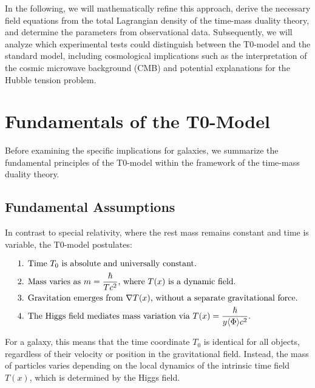 \documentclass[a4paper,12pt]{article}
\newcommand{\Tfield}{T(x)}
\begin{document}
	In the following, we will mathematically refine this approach, derive the necessary field equations from the total Lagrangian density of the time-mass duality theory, and determine the parameters from observational data. Subsequently, we will analyze which experimental tests could distinguish between the T0-model and the standard model, including cosmological implications such as the interpretation of the cosmic microwave background (CMB) and potential explanations for the Hubble tension problem.
	
	\section{Fundamentals of the T0-Model}
	
	Before examining the specific implications for galaxies, we summarize the fundamental principles of the T0-model within the framework of the time-mass duality theory.
	
	\subsection{Fundamental Assumptions}
	
	In contrast to special relativity, where the rest mass remains constant and time is variable, the T0-model postulates:
	
	\begin{tcolorbox}[colback=blue!5!white,colframe=blue!75!black,title=Fundamental Assumptions of the T0-Model]
		\begin{align}
			&\text{1. Time \( T_0 \) is absolute and universally constant.} \\
			&\text{2. Mass varies as \( m = \frac{\hbar}{T c^2} \), where \( \Tfield \) is a dynamic field.} \\
			&\text{3. Gravitation emerges from \( \nabla \Tfield \), without a separate gravitational force.} \\
			&\text{4. The Higgs field mediates mass variation via \( \Tfield = \frac{\hbar}{y \langle \Phi \rangle c^2} \).}
		\end{align}
	\end{tcolorbox}
	
	For a galaxy, this means that the time coordinate \( T_0 \) is identical for all objects, regardless of their velocity or position in the gravitational field. Instead, the mass of particles varies depending on the local dynamics of the intrinsic time field \( \Tfield \), which is determined by the Higgs field.
	
\end{document}
